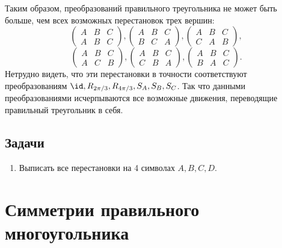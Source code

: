 \begin{enumerate}
Таким образом, преобразований правильного треугольника не может быть больше, чем всех возможных перестановок трех вершин:
$$
\begin{pmatrix}
A & B & C \\
A & B & C
\end{pmatrix},
\begin{pmatrix}
A & B & C \\
B & C & A
\end{pmatrix},
\begin{pmatrix}
A & B & C \\
C & A & B
\end{pmatrix},
$$
$$
\begin{pmatrix}
A & B & C \\
A & C & B
\end{pmatrix},
\begin{pmatrix}
A & B & C \\
C & B & A
\end{pmatrix},
\begin{pmatrix}
A & B & C \\
B & A & C
\end{pmatrix}.
$$
Нетрудно видеть, что эти перестановки в точности соответствуют преобразованиям $\id, R_{2\pi/3}, R_{4\pi/3}, S_A, S_B, S_C$. Так что данными преобразованиями исчерпываются все возможные движения, переводящие правильный треугольник в себя.
\end{enumerate}
\subsection*{Задачи}
\begin{enumerate}
\item Выписать все перестановки на 4 символах $A,B,C,D$.
\end{enumerate}



\section{Симметрии правильного многоугольника}




